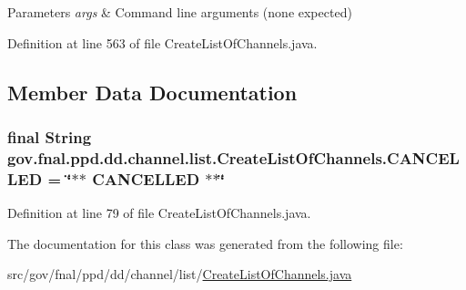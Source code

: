 \begin{DoxyParams}{Parameters}
{\em args} & Command line arguments (none expected) \\
\hline
\end{DoxyParams}


Definition at line 563 of file Create\-List\-Of\-Channels.\-java.



\subsection{Member Data Documentation}
\hypertarget{classgov_1_1fnal_1_1ppd_1_1dd_1_1channel_1_1list_1_1CreateListOfChannels_a0eefced0aa80da149689c678803811f2}{
\subsubsection[{C\-A\-N\-C\-E\-L\-L\-E\-D}]{\setlength{\rightskip}{0pt plus 5cm}final String gov.\-fnal.\-ppd.\-dd.\-channel.\-list.\-Create\-List\-Of\-Channels.\-C\-A\-N\-C\-E\-L\-L\-E\-D = \char`\"{}$\ast$$\ast$ C\-A\-N\-C\-E\-L\-L\-E\-D $\ast$$\ast$\char`\"{}\hspace{0.3cm}{\ttfamily [static]}}}\label{classgov_1_1fnal_1_1ppd_1_1dd_1_1channel_1_1list_1_1CreateListOfChannels_a0eefced0aa80da149689c678803811f2}


Definition at line 79 of file Create\-List\-Of\-Channels.\-java.



The documentation for this class was generated from the following file\-:\begin{DoxyCompactItemize}
\item 
src/gov/fnal/ppd/dd/channel/list/\hyperlink{CreateListOfChannels_8java}{Create\-List\-Of\-Channels.\-java}\end{DoxyCompactItemize}

